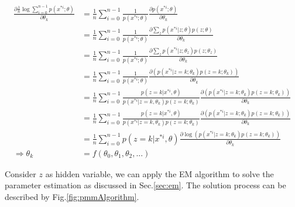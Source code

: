 \documentclass[runningheads,openany]{xhlPaper}
\begin{document}
\begin{equation}
\label{equ:pmm_unable_solve_parameter_directly}
\begin{aligned}
\frac{{\partial \frac{1}{n}\log \sum\limits_{i = 0}^{n - 1} {p\left( {{x^{*i}};\theta } \right)} }}{{\partial {\theta _k}}} &= \frac{1}{n}\sum\limits_{i = 0}^{n - 1} {\frac{1}{{p\left( {{x^{*i}};\theta } \right)}}} \frac{{\partial p\left( {{x^{*i}};\theta } \right)}}{{\partial {\theta _k}}}\\
 &= \frac{1}{n}\sum\limits_{i = 0}^{n - 1} {\frac{1}{{p\left( {{x^{*i}};\theta } \right)}}} \frac{{\partial \sum\limits_z {p\left( {{x^{*i}}|z;\theta } \right)p\left( {z;\theta } \right)} }}{{\partial {\theta _k}}}\\
 &= \frac{1}{n}\sum\limits_{i = 0}^{n - 1} {\frac{1}{{p\left( {{x^{*i}};\theta } \right)}}} \frac{{\partial \sum\limits_z {p\left( {{x^{*i}}|z;{\theta _z}} \right)p\left( {z;{\theta _z}} \right)} }}{{\partial {\theta _k}}}\\
 &= \frac{1}{n}\sum\limits_{i = 0}^{n - 1} {\frac{1}{{p\left( {{x^{*i}};\theta } \right)}}} \frac{{\partial \left( {p\left( {{x^{*i}}|z = k;{\theta _k}} \right)p\left( {z = k;{\theta _k}} \right)} \right)}}{{\partial {\theta _k}}}\\
 &= \frac{1}{n}\sum\limits_{i = 0}^{n - 1} {\frac{{p\left( {z = k|{x^{*i}},\theta } \right)}}{{p\left( {{x^{*i}}|z = k,{\theta _k}} \right)p\left( {z = k;{\theta _k}} \right)}}} \frac{{\partial \left( {p\left( {{x^{*i}}|z = k;{\theta _k}} \right)p\left( {z = k;{\theta _k}} \right)} \right)}}{{\partial {\theta _k}}}\\
 &= \frac{1}{n}\sum\limits_{i = 0}^{n - 1} {\frac{{p\left( {z = k|{x^{*i}},\theta } \right)}}{{p\left( {{x^{*i}}|z = k,{\theta _k}} \right)p\left( {z = k;{\theta _k}} \right)}}} \frac{{\partial \left( {p\left( {{x^{*i}}|z = k;{\theta _k}} \right)p\left( {z = k;{\theta _k}} \right)} \right)}}{{\partial {\theta _k}}}\\
 &= \frac{1}{n}\sum\limits_{i = 0}^{n - 1} {p\left( {z = k|{x^{*i}},\theta } \right)} \frac{{\partial \log \left( {p\left( {{x^{*i}}|z = k;{\theta _k}} \right)p\left( {z = k;{\theta _k}} \right)} \right)}}{{\partial {\theta _k}}}\\
 \Rightarrow {\theta _k} &= f\left( {{\theta _0},{\theta _1},{\theta _2},...} \right)
\end{aligned}
\end{equation}

Consider $z$ as hidden variable, we can apply the EM algorithm to solve the parameter estimation as discussed in Sec.\ref{sec:em}.
The solution process can be described by Fig.\ref{fig:pmmAlgorithm}.
\end{document}

